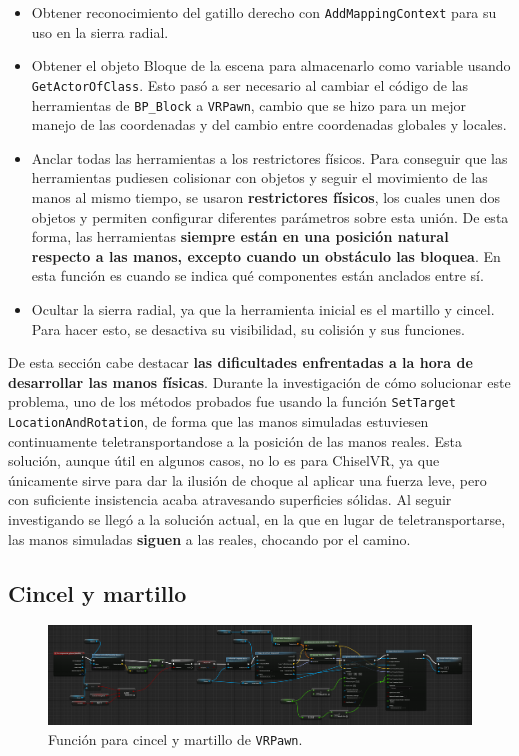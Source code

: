 \begin{itemize}
    \item Obtener reconocimiento del gatillo derecho con \texttt{AddMappingContext} para su uso en la sierra radial.
    \item Obtener el objeto Bloque de la escena para almacenarlo como variable usando \texttt{GetActorOfClass}. Esto pasó a ser necesario al cambiar el código de las herramientas de \texttt{BP\_Block} a \texttt{VRPawn}, cambio que se hizo para un mejor manejo de las coordenadas y del cambio entre coordenadas globales y locales.
    \item Anclar todas las herramientas a los restrictores físicos. Para conseguir que las herramientas pudiesen colisionar con objetos y seguir el movimiento de las manos al mismo tiempo, se usaron \textbf{restrictores físicos}, los cuales unen dos objetos y permiten configurar diferentes parámetros sobre esta unión. De esta forma, las herramientas \textbf{siempre están en una posición natural respecto a las manos, excepto cuando un obstáculo las bloquea}. En esta función es cuando se indica qué componentes están anclados entre sí.
    \item Ocultar la sierra radial, ya que la herramienta inicial es el martillo y cincel. Para hacer esto, se desactiva su visibilidad, su colisión y sus funciones.
\end{itemize}

De esta sección cabe destacar \textbf{las dificultades enfrentadas a la hora de desarrollar las manos físicas}. Durante la investigación de cómo solucionar este problema, uno de los métodos probados fue usando la función \texttt{SetTarget LocationAndRotation}, de forma que las manos simuladas estuviesen continuamente teletransportandose a la posición de las manos reales. Esta solución, aunque útil en algunos casos, no lo es para ChiselVR, ya que únicamente sirve para dar la ilusión de choque al aplicar una fuerza leve, pero con suficiente insistencia acaba atravesando superficies sólidas. Al seguir investigando se llegó a la solución actual, en la que en lugar de teletransportarse, las manos simuladas \textbf{siguen} a las reales, chocando por el camino.

\subsection{Cincel y martillo}

\begin{figure}[H]
	\centering
	\includegraphics[width=12cm]{imagenes/martilloycincel}
	\caption{Función para cincel y martillo de \texttt{VRPawn}.}
	\label{fig:martilloycincel}
\end{figure}

